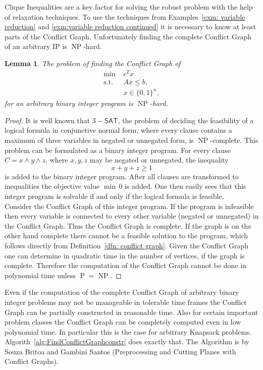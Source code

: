 \documentclass[titlepage, a4paper]{amsbook}
\theoremstyle{plain}
\newtheorem{lem}[thm]{Lemma}
\theoremstyle{break}
\theoremstyle{definition}
\theoremstyle{remark}
\numberwithin{equation}{thm}
\DeclareMathOperator{\NP}{NP}
\DeclareMathOperator{\PP}{P}
\begin{document}
Clique Inequalities are a key factor for solving the robust problem with the help of relaxation techniques. To use the techniques from Examples~\ref{exm: variable reduction} and \ref{exm:variable reduction continued} it is necessary to know at least parts of the Conflict Graph.
Unfortunately finding the complete Conflict Graph of an arbitrary IP
is $\NP$-hard.
\begin{lem}
The problem of finding the Conflict Graph of
\begin{align*}
    \text{min } &c^T x \\
    \text{s.t. } &Ax \leq b, \\
    &x \in \{0,1\}^n,
\end{align*}
for an arbitrary binary integer program is $\NP$-hard.
\end{lem}
\begin{proof}
It is well known that $3-\mathsf{SAT}$, the problem of deciding the feasibility of a logical formula in conjunctive normal form, where every clause contains a maximum of three variables in negated or unnegated form, is $\NP$-complete. This problem can be formulated as a binary integer program. For every clause $C=x \wedge y \wedge z$, where $x,y,z$ may be negated or unnegated, the inequality
\[x + y + z \geq 1\]
is added to the binary integer program. After all clauses are transformed to inequalities the objective value $\min\,0$ is added. One then easily sees that this integer program is solvable if and only if the logical formula is feasible. \\
Consider the Conflict Graph of this integer program. If the program is infeasible then every variable is connected to every other variable (negated or unnegated) in the Conflict Graph. Thus the Conflict Graph is complete. If the graph is on the other hand complete there cannot be a feasible solution to the program, which follows directly from Definition~\ref{dfn: conflict graph}. Given the Conflict Graph one can determine in quadratic time in the number of vertices, if the graph is complete. Therefore the computation of the Conflict Graph cannot be done in polynomial time unless $\PP = \NP$.
\end{proof}
Even if the computation of the complete Conflict Graph of arbitrary binary integer problems may not be manageable in tolerable time frames the Conflict Graph can be partially constructed in reasonable time. Also for certain important problem classes the Conflict Graph can be completely computed even in low polynomial time. In particular this is the case for arbitrary Knapsack problems. Algorith~\ref{alg:FindConflictGraphconstr} does exactly that. The Algorithm is by Souza Britoa and Gambini Santos (Preprocessing and Cutting Planes with Conflict Graphs).
\end{document}
